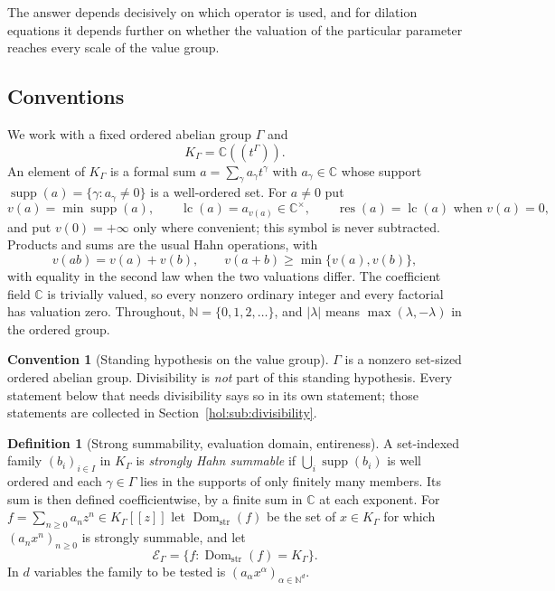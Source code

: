 \documentclass[11pt]{article}
\numberwithin{equation}{section}
\theoremstyle{definition}
\newtheorem{definition}[theorem]{Definition}
\newtheorem{convention}[theorem]{Convention}
\theoremstyle{remark}
\newcommand{\C}{\mathbb C}
\newcommand{\N}{\mathbb N}
\newcommand{\K}{K_\Gamma}
\newcommand{\E}{\mathcal E_\Gamma}
\newcommand{\supp}{\operatorname{supp}}
\newcommand{\lc}{\operatorname{lc}}
\newcommand{\res}{\operatorname{res}}
\newcommand{\Dom}{\operatorname{Dom}_{\mathrm{str}}}
\newcommand{\abs}[1]{\lvert#1\rvert}
\begin{document}
The answer depends decisively on which operator is used, and for dilation
equations it depends further on whether the valuation of the particular
parameter reaches every scale of the value group.

\subsection{Conventions}\label{hol:sub:conventions}

We work with a fixed ordered abelian group $\Gamma$ and
\[
   \K=\C((t^\Gamma)).
\]
An element of $\K$ is a formal sum $a=\sum_{\gamma}a_\gamma t^\gamma$ with
$a_\gamma\in\C$ whose support $\supp(a)=\{\gamma:a_\gamma\ne0\}$ is a
well-ordered set. For $a\ne0$ put
\[
 v(a)=\min\supp(a),\qquad \lc(a)=a_{v(a)}\in\C^\times,
 \qquad \res(a)=\lc(a)\text{ when }v(a)=0,
\]
and put $v(0)=+\infty$ only where convenient; this symbol is never subtracted.
Products and sums are the usual Hahn operations, with
\begin{equation}\label{hol:eq:valuationlaws}
 v(ab)=v(a)+v(b),\qquad
 v(a+b)\ge\min\{v(a),v(b)\},
\end{equation}
with equality in the second law when the two valuations differ. The
coefficient field $\C$ is trivially valued, so every nonzero ordinary integer
and every factorial has valuation zero. Throughout, $\N=\{0,1,2,\ldots\}$, and
$\abs\lambda$ means $\max(\lambda,-\lambda)$ in the ordered group.

\begin{convention}[Standing hypothesis on the value group]
\label{hol:conv:group}
$\Gamma$ is a nonzero set-sized ordered abelian group. Divisibility is
\emph{not} part of this standing hypothesis. Every statement below that needs
divisibility says so in its own statement; those statements are collected in
Section~\ref{hol:sub:divisibility}.
\end{convention}

\begin{definition}[Strong summability, evaluation domain, entireness]
\label{hol:def:entire}
A set-indexed family $(b_i)_{i\in I}$ in $\K$ is \emph{strongly Hahn summable}
if $\bigcup_i\supp(b_i)$ is well ordered and each $\gamma\in\Gamma$ lies in the
supports of only finitely many members. Its sum is then defined
coefficientwise, by a finite sum in $\C$ at each exponent. For
$f=\sum_{n\ge0}a_nz^n\in\K[[z]]$ let $\Dom(f)$ be the set of $x\in\K$ for
which $(a_nx^n)_{n\ge0}$ is strongly summable, and let
\[
 \E=\{f:\Dom(f)=\K\}.
\]
In $d$ variables the family to be tested is $(a_\alpha x^\alpha)_{\alpha\in\N^d}$.
\end{definition}
\end{document}

